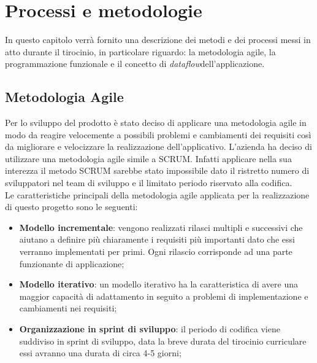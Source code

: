 
\chapter{Processi e metodologie}
\label{cap:processi-metodologie}

In questo capitolo verrà fornito una descrizione dei metodi e dei processi messi in atto durante il tirocinio, in particolare riguardo: la metodologia agile, la programmazione funzionale e il concetto di \emph{dataflow}\glosp dell'applicazione.

\section{Metodologia Agile}
Per lo sviluppo del prodotto è stato deciso di applicare una metodologia agile in modo da reagire velocemente a possibili problemi e cambiamenti dei requisiti così da migliorare e velocizzare la realizzazione dell'applicativo. L'azienda ha deciso di utilizzare una metodologia agile simile a SCRUM. Infatti applicare nella sua interezza il metodo SCRUM sarebbe stato impossibile dato il ristretto numero di sviluppatori nel team di sviluppo e il limitato periodo riservato alla codifica. \\
Le caratteristiche principali della metodologia agile applicata per la realizzazione di questo progetto sono le seguenti:
\begin{itemize}
	\item \textbf{Modello incrementale}: vengono realizzati rilasci multipli e successivi che aiutano a definire più chiaramente i requisiti più importanti dato che essi verranno implementati per primi. Ogni rilascio corrisponde ad una parte funzionante di applicazione;
	
	\item \textbf{Modello iterativo}: un modello iterativo ha la caratteristica di avere una maggior capacità di adattamento in seguito a problemi di implementazione e cambiamenti nei requisiti;
	
	\item \textbf{Organizzazione in sprint di sviluppo}: il periodo di codifica viene suddiviso in sprint di sviluppo, data la breve durata del tirocinio curriculare essi avranno una durata di circa 4-5 giorni;
\end{itemize}

